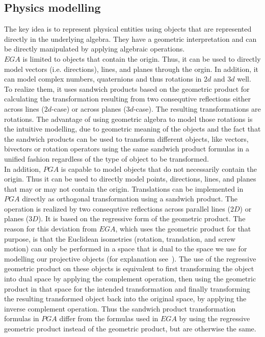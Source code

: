 \subsection{Physics modelling}
\label{physics_modelling}

The key idea is to represent physical entities using objects that are represented directly
in the underlying algebra. They have a geometric interpretation and can be directly
manipulated by applying algebraic operations. \\

$EGA$ is limited to objects that contain the origin. Thus, it can be used to directly
model vectors (i.e. directions), lines, and planes through the orgin. In addition, it can
model complex numbers, quaternions and thus rotations in $2d$ and $3d$ well. To realize
them, it uses sandwich products based on the geometric product for calculating the
transformation resulting from two consequtive reflections either across lines ($2d$-case)
or across planes ($3d$-case). The resulting transformations are rotations. The advantage
of using geometric algebra to model those rotations is the intuitive modelling, due to
geometric meaning of the objects and the fact that the sandwich products can be used to
transform different objects, like vectors, bivectors or rotation operators using the same
sandwich product formulas in a unified fashion regardless of the type of object to be
transformed.\\

In addition, $PGA$ is capable to model objects that do not necessarily contain the origin.
Thus it can be used to directly model points, directions, lines, and planes that may or
may not contain the origin. Translations can be implemented in $PGA$ directly as
orthogonal transformation using a sandwich product. The operation is realized by two
consequtive reflections across parallel lines ($2D$) or planes ($3D$). It is based on the
regressive form of the geometric product. The reason for this deviation from $EGA$, which
uses the geometric product for that purpose, is that the Euclidean isometries (rotation,
translation, and screw motion) can only be performed in a space that is dual to the space
we use for modelling our projective objects (for explanation
see~\cite{Lengyel_pga-illuminated:2024}). The use of the regressive geometric product on
these objects is equivalent to first transforming the object into dual space by applying
the complement operation, then using the geometric product in that space for the intended
transformation and finally transforming the resulting transformed object back into the
original space, by applying the inverse complement operation. Thus the sandwich product
transformation formulas in $PGA$ differ from the formulas used in $EGA$ by using the
regressive geometric product instead of the geometric product, but are otherwise the same.
\\

